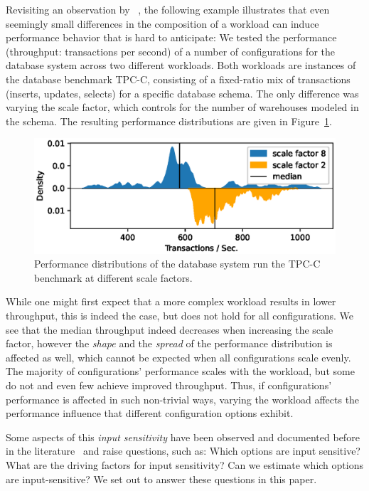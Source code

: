 Revisiting an observation by \citeauthor{alves_sampling_2020}~\cite{alves_sampling_2020}, the following example illustrates that even seemingly small differences in the composition of a workload can induce performance behavior that is hard to anticipate: We tested the performance (throughput: transactions per second) of a number of configurations for the database system \htwo across two different workloads. Both workloads are instances of the database benchmark \textsf{TPC-C}, consisting of a fixed-ratio mix of transactions (inserts, updates, selects) for a specific database schema. The only difference was varying the scale factor, which controls for the number of warehouses modeled in the schema. The resulting performance distributions are given in Figure~\ref{fig:h2_intro}.
\begin{figure}
	\centering
	\includegraphics[width=0.8\linewidth]{images/h2_motivation.eps}
	\caption{Performance distributions of the database system \htwo run the \textsf{TPC-C} benchmark at different scale factors.}
	\label{fig:h2_intro}
\end{figure}
While one might first expect that a more complex workload results in lower throughput, this is indeed the case, but does not hold for all configurations. {\color{purple}We see that the median throughput indeed decreases when increasing the scale factor, however the \emph{shape} and the \emph{spread} of the performance distribution is affected as well, which cannot be expected when all configurations scale evenly. The majority of configurations' performance scales with the workload, but some do not and even few achieve improved throughput. Thus, if configurations’ performance is affected in such non-trivial ways, varying the workload affects the performance influence that different configuration options exhibit.}

Some aspects of this \emph{input sensitivity} have been observed and documented before in the literature~\cite{liao_2020_using_emse,alves_sampling_2020,jamishidi_transfer_2017} and raise questions, such as: Which options are input sensitive? What are the driving factors for input sensitivity? Can we estimate which options are input-sensitive? We set out to answer these questions in this paper.

